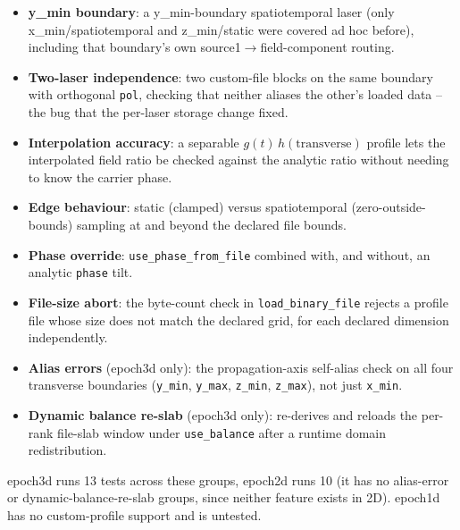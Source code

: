 \documentclass[11pt,a4paper]{article}
\begin{document}
\begin{itemize}
  \item \textbf{y\_min boundary}: a y\_min-boundary spatiotemporal
    laser (only x\_min/spatiotemporal and z\_min/static were covered
    ad hoc before), including that boundary's own
    source1$\to$field-component routing.
  \item \textbf{Two-laser independence}: two custom-file blocks on
    the same boundary with orthogonal \texttt{pol}, checking that
    neither aliases the other's loaded data -- the bug that the
    per-laser storage change fixed.
  \item \textbf{Interpolation accuracy}: a separable
    $g(t)\,h(\mathrm{transverse})$ profile lets the interpolated
    field ratio be checked against the analytic ratio without
    needing to know the carrier phase.
  \item \textbf{Edge behaviour}: static (clamped) versus
    spatiotemporal (zero-outside-bounds) sampling at and beyond the
    declared file bounds.
  \item \textbf{Phase override}: \texttt{use\_phase\_from\_file}
    combined with, and without, an analytic \texttt{phase} tilt.
  \item \textbf{File-size abort}: the byte-count check in
    \texttt{load\_binary\_file} rejects a profile file whose size
    does not match the declared grid, for each declared dimension
    independently.
  \item \textbf{Alias errors} (epoch3d only): the propagation-axis
    self-alias check on all four transverse boundaries
    (\texttt{y\_min}, \texttt{y\_max}, \texttt{z\_min},
    \texttt{z\_max}), not just \texttt{x\_min}.
  \item \textbf{Dynamic balance re-slab} (epoch3d only): re-derives
    and reloads the per-rank file-slab window under
    \texttt{use\_balance} after a runtime domain redistribution.
\end{itemize}

epoch3d runs 13 tests across these groups, epoch2d runs 10 (it has no
alias-error or dynamic-balance-re-slab groups, since neither feature
exists in 2D). epoch1d has no custom-profile support and is untested.
\end{document}
